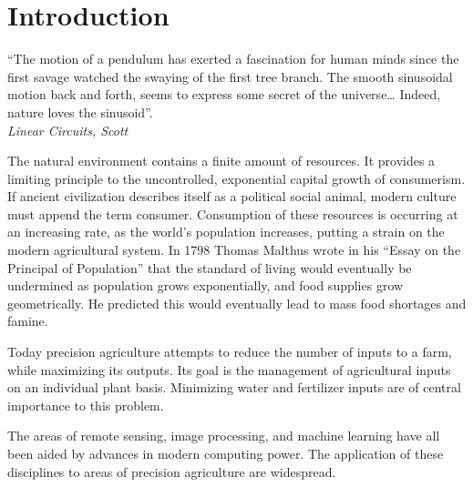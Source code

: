 \chapter{Introduction}

\begin{center}
  \begin{minipage}{0.75\textwidth}
    \begin{small}
      “The motion of a pendulum has exerted a fascination for human minds since the first savage watched the swaying of the first tree branch. The smooth sinusoidal motion back and forth, seems to express some secret of the universe…
      Indeed, nature loves the sinusoid”.\\
      \null\hfill\emph{Linear Circuits, Scott}
    \end{small}
  \end{minipage}
  \vspace{0.5cm}
\end{center}

\noindent The natural environment\cite{knuthwebsite} contains a finite amount of resources.  It provides a limiting principle to the uncontrolled, exponential capital growth of consumerism.  If ancient civilization describes itself as a political social animal, modern culture must append the term consumer. Consumption of these resources is occurring at an increasing rate, as the world’s population increases, putting a strain on the modern agricultural system.  In 1798 Thomas Malthus wrote in his “Essay on the Principal of Population” that the standard of living would eventually be undermined as population grows exponentially, and food supplies grow geometrically.  He predicted this would eventually lead to mass food shortages and famine.

Today precision agriculture attempts to reduce the number of inputs to a farm, while maximizing its outputs.  Its goal is the management of agricultural inputs on an individual plant basis.  Minimizing water and fertilizer inputs are of central importance to this problem.

The areas of remote sensing, image processing, and machine learning have all been aided by advances in modern computing power.  The application of these disciplines to areas of precision agriculture are widespread.

